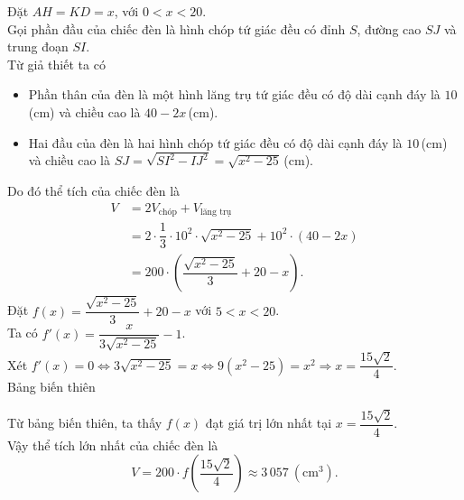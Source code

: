 \begin{ex}
{\begin{center}
		\end{center}
		Đặt $AH=KD=x$, với $0<x<20$.\\
		Gọi phần đầu của chiếc đèn là hình chóp tứ giác đều có đỉnh $S$, đường cao $SJ$ và trung đoạn $SI$.\\
		Từ giả thiết ta có 
		\begin{itemize}
			\item Phần thân của đèn là một hình lăng trụ tứ giác đều có độ dài cạnh đáy là $10$\,(cm) và chiều cao là $40-2x$\,(cm).
			\item Hai đầu của đèn là hai hình chóp tứ giác đều có độ dài cạnh đáy là $10$\,(cm) và chiều cao là $SJ=\sqrt{SI^2-IJ^2}=\sqrt{x^2-25}$\,(cm).
		\end{itemize}
		Do đó thể tích của chiếc đèn là 
		\allowdisplaybreaks
		\begin{align*}
			V&=2V_\text{chóp}+V_\text{lăng trụ}
			\\
			&=2\cdot \dfrac{1}{3}\cdot 10^2\cdot \sqrt{x^2-25}+10^2\cdot (40-2x)
			\\
			&= 200\cdot \left(\dfrac{\sqrt{x^2-25}}{3}+20-x\right).
		\end{align*}
		Đặt $f(x)=\dfrac{\sqrt{x^2-25}}{3}+20-x$ với $5<x<20$.
		\\
		Ta có $f'(x)=\dfrac{x}{3\sqrt{x^2-25}}-1$.
		\\
		Xét $f'(x)=0\Leftrightarrow 3\sqrt{x^2-25}=x\Leftrightarrow 9\left(x^2-25\right)=x^2\Rightarrow x=\dfrac{15\sqrt{2}}{4}$.
		\\
		Bảng biến thiên 
		\begin{center}
		\end{center}
		Từ bảng biến thiên, ta thấy $f(x)$ đạt giá trị lớn nhất tại $x=\dfrac{15\sqrt{2}}{4}$.
		\\
		Vậy thể tích lớn nhất của chiếc đèn là
		\[V=200\cdot f\left(\dfrac{15\sqrt{2}}{4}\right)\approx 3\,057\ \left(\text{cm}^3\right).\]
	}
\end{ex}

